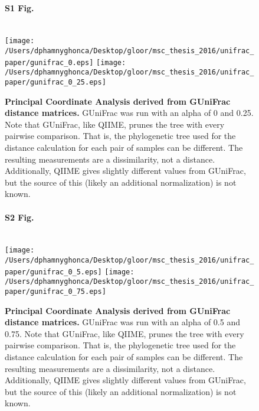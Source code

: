 \documentclass[10pt,letterpaper]{article}
\begin{document}
\begin{figure}[h]
\paragraph*{S1 Fig.}\mbox{}\\
\texttt{[image: /Users/dphamnyghonca/Desktop/gloor/msc\_thesis\_2016/unifrac\_paper/gunifrac\_0.eps]}
\texttt{[image: /Users/dphamnyghonca/Desktop/gloor/msc\_thesis\_2016/unifrac\_paper/gunifrac\_0\_25.eps]}
\caption[Principal Coordinate Analysis derived from GUniFrac distance matrices.]{{\bf Principal Coordinate Analysis derived from GUniFrac distance matrices. } GUniFrac was run with an alpha of 0 and 0.25. Note that GUniFrac, like QIIME, prunes the tree with every pairwise comparison. That is, the phylogenetic tree used for the distance calculation for each pair of samples can be different. The resulting measurements are a dissimilarity, not a distance. Additionally, QIIME gives slightly different values from GUniFrac, but the source of this (likely an additional normalization) is not known.}
\label{gunifrac_1}
\end{figure}

\begin{figure}[h]
\paragraph*{S2 Fig.}\mbox{}\\
\texttt{[image: /Users/dphamnyghonca/Desktop/gloor/msc\_thesis\_2016/unifrac\_paper/gunifrac\_0\_5.eps]}
\texttt{[image: /Users/dphamnyghonca/Desktop/gloor/msc\_thesis\_2016/unifrac\_paper/gunifrac\_0\_75.eps]}
\caption[Principal Coordinate Analysis derived from GUniFrac distance matrices.]{{\bf Principal Coordinate Analysis derived from GUniFrac distance matrices. } GUniFrac was run with an alpha of 0.5 and 0.75. Note that GUniFrac, like QIIME, prunes the tree with every pairwise comparison. That is, the phylogenetic tree used for the distance calculation for each pair of samples can be different. The resulting measurements are a dissimilarity, not a distance. Additionally, QIIME gives slightly different values from GUniFrac, but the source of this (likely an additional normalization) is not known.}
\label{gunifrac_2}
\end{figure}
\end{document}
